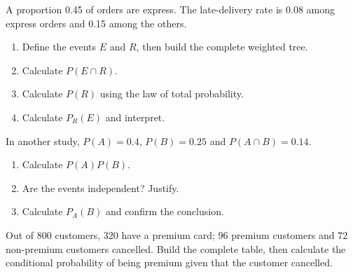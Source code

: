 \begin{exercice}
A proportion 0.45 of orders are express. The late-delivery rate is 0.08 among express orders and 0.15 among the others.
\begin{enumerate}
\item Define the events $E$ and $R$, then build the complete weighted tree.
\item Calculate $P(E\cap R)$.
\item Calculate $P(R)$ using the law of total probability.
\item Calculate $P_R(E)$ and interpret.
\end{enumerate}
\end{exercice}
\begin{exercice}[2 -- Independence]
In another study, $P(A)=0.4$, $P(B)=0.25$ and $P(A\cap B)=0.14$.
\begin{enumerate}
\item Calculate $P(A)P(B)$.
\item Are the events independent? Justify.
\item Calculate $P_A(B)$ and confirm the conclusion.
\end{enumerate}
\end{exercice}
\begin{exercice}
Out of $800$ customers, $320$ have a premium card; $96$ premium customers and $72$ non-premium customers cancelled. Build the complete table, then calculate the conditional probability of being premium given that the customer cancelled.
\end{exercice}

